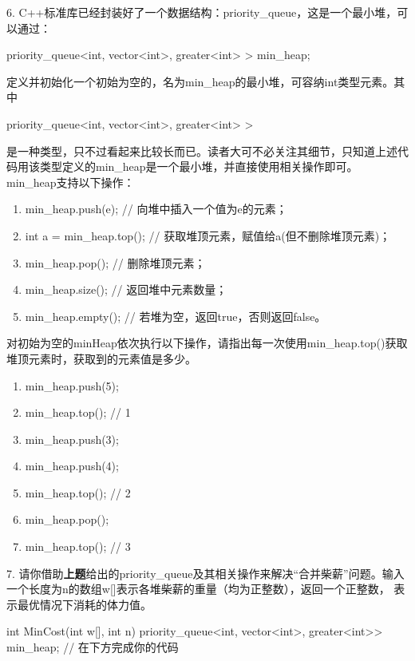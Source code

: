     6. C++标准库已经封装好了一个数据结构：priority\_queue，这是一个最小堆，可以通过：
    \begin{bulk}
        priority\_queue<int, vector<int>, greater<int> > min\_heap;
    \end{bulk}
    定义并初始化一个初始为空的，名为min\_heap的最小堆，可容纳int类型元素。其中
    \begin{bulk}
        priority\_queue<int, vector<int>, greater<int> >
    \end{bulk}
    是一种类型，只不过看起来比较长而已。读者大可不必关注其细节，只知道上述代码用该类型定义的min\_heap是一个最小堆，并直接使用相关操作即可。
    min\_heap支持以下操作：
    \begin{enumerate}[label=\arabic*）]
        \item min\_heap.push(e);  // 向堆中插入一个值为e的元素；
        \item int a = min\_heap.top();   // 获取堆顶元素，赋值给a(但不删除堆顶元素)；
        \item min\_heap.pop();       // 删除堆顶元素；
        \item min\_heap.size();      // 返回堆中元素数量；
        \item min\_heap.empty();     // 若堆为空，返回true，否则返回false。
    \end{enumerate}
    对初始为空的minHeap依次执行以下操作，请指出每一次使用min\_heap.top()获取堆顶元素时，获取到的元素值是多少。
    \begin{enumerate}[label=\arabic*）]
        \item min\_heap.push(5);
        \item min\_heap.top();    // 1
        \item min\_heap.push(3);
        \item min\_heap.push(4);
        \item min\_heap.top();    // 2
        \item min\_heap.pop();
        \item min\_heap.top();    // 3
    \end{enumerate}

    \vspace{\baselineskip}

    7. 请你借助{\color{red}\textbf{上题}}给出的priority\_queue及其相关操作来解决“合并柴薪”问题。输入一个长度为n的数组w[]表示各堆柴薪的重量（均为正整数），返回一个正整数，
    表示最优情况下消耗的体力值。
    \begin{cppcode}
        int MinCost(int w[], int n) {
            priority_queue<int, vector<int>, greater<int>> min_heap;
            // 在下方完成你的代码
        }
    \end{cppcode}

